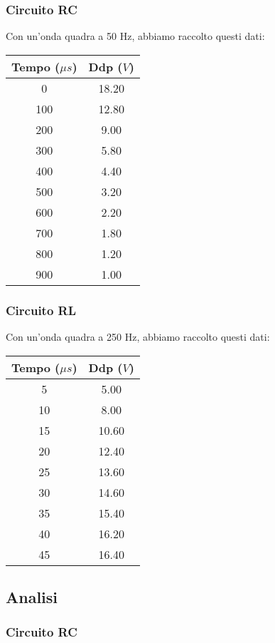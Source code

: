 \subsubsection{Circuito RC}
Con un'onda quadra a 50 Hz, abbiamo raccolto questi dati:
\begin{center}
\begin{tabular}{*{2}{c}}
Tempo ($\mu s$) & Ddp ($V$) \\
\midrule
0 & 18.20 \\
100 & 12.80 \\
200 & 9.00 \\
300 & 5.80 \\
400 & 4.40 \\
500 & 3.20 \\
600 & 2.20 \\
700 & 1.80 \\
800 & 1.20 \\
900 & 1.00 \\
\end{tabular}
\end{center}


\subsubsection{Circuito RL}
Con un'onda quadra a 250 Hz, abbiamo raccolto questi dati:

\begin{center}
\begin{tabular}{*{2}{c}}
Tempo ($\mu s$) & Ddp ($V$) \\
\midrule
5 & 5.00 \\
10 & 8.00 \\
15 & 10.60 \\
20 & 12.40 \\
25 & 13.60 \\
30 & 14.60 \\
35 & 15.40 \\
40 & 16.20 \\
45 & 16.40 \\
\end{tabular}
\end{center}

\subsection{Analisi}

\subsubsection{Circuito RC}
